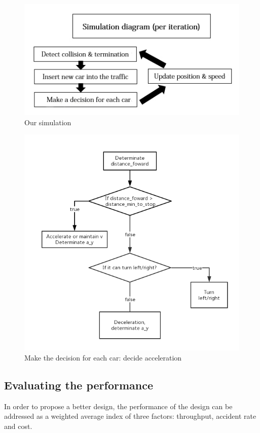 \documentclass{mcmthesis}
\begin{document}
\begin{figure}[H]
	\small 
	\centering
	
	\includegraphics{simulation.jpg}
	\caption{Our simulation}
\end{figure}
\begin{figure}[H]
	\small 
	\centering
	
	\includegraphics[width=5in]{decide_acc.png}
	\caption{Make the decision for each car: decide acceleration}
\end{figure}
\subsection{Evaluating the performance}

In order to propose a better design, the performance of the design can be addressed as a weighted average index of three factors: throughput, accident rate and cost. 
\end{document}
